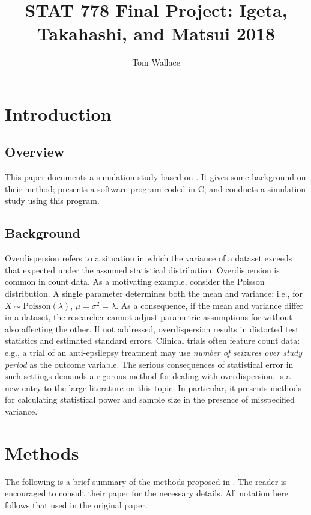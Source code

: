 \documentclass{article}
\author{Tom Wallace}
\title{STAT 778 Final Project: Igeta, Takahashi, and Matsui
2018}
\begin{document}
\maketitle

\section{Introduction}

\subsection{Overview}

This paper documents a simulation study based on \cite{igeta2018}. It
gives some background on their method; presents a software program coded in C; 
and conducts a simulation study using this program. 

\subsection{Background}

Overdispersion refers to a situation in which the variance of a dataset exceeds
that expected under the assumed statistical distribution. 
Overdispersion is common in count data. As a motivating example, consider the
Poisson distribution. A single parameter determines both the 
mean and variance: i.e., for $X \sim \mathrm{Poisson}(\lambda)$, $\mu =
\sigma^2 = \lambda$. As a consequence, if the mean and variance
differ in a dataset, the researcher cannot adjust parametric assumptions for 
without also affecting the other. If not addressed, 
overdispersion results in distorted test statistics and estimated
standard errors. Clinical trials often feature count data: e.g., a trial of an
anti-epsilepsy treatment may use \textit{number of seizures over study period} as the outcome
variable. The serious consequences of statistical error in such settings demands
a rigorous method for dealing with overdispersion. \cite{igeta2018} is a new
entry to the large literature on this topic. In particular, it presents methods
for calculating statistical power and sample size in the presence of
misspecified variance.

\section{Methods}

The following is a brief summary of the methods proposed in \cite{igeta2018}.
The reader is encouraged to consult their paper for the necessary details. All
notation here follows that used in the original paper.
\end{document}
